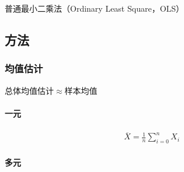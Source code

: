 \documentclass[12pt]{book}
\begin{document}
普通最小二乘法（Ordinary Least Square，OLS）

\subsection{方法}

\subsubsection{均值估计}
总体均值估计$\approx$样本均值

\paragraph{一元}

\begin{gather*}
    \overline{X}=\frac{1}{n}\sum_{i=0}^{n}X_i
\end{gather*}



\paragraph{多元}
\end{document}
